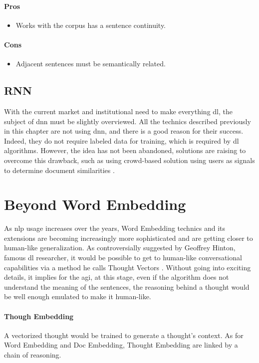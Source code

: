 \paragraph{Pros}
\begin{itemize}
    \setlength\itemsep{0em}
    \item Works with the corpus has a sentence continuity.
\end{itemize}
\paragraph{Cons}
\begin{itemize}
    \setlength\itemsep{0em}
    \item Adjacent sentences must be semantically related.
\end{itemize}

\subsection{RNN}
With the current market and institutional need to make everything \gls{dl}, the subject of \gls{dnn} must be slightly overviewed. All the technics described previously in this chapter are not using \gls{dnn}, and there is a good reason for their success. Indeed, they do not require labeled data for training, which is required by \gls{dl} algorithms. However, the idea has not been abandoned, solutions are raising to overcome this drawback, such as using crowd-based solution using users as signals to determine document similarities \cite{article:lstm-deep-sentence-embedding}.



\section{Beyond Word Embedding}
As \gls{nlp} usage increases over the years, Word Embedding technics and its extensions are becoming increasingly more sophisticated and are getting closer to human-like generalization. As controversially suggested by Geoffrey Hinton, famous \gls{dl} researcher, it would be possible to get to human-like conversational capabilities via a method he calls Thought Vectors \cite{article:thought2vec-geoffrey-hinton}. Without going into exciting details, it implies for the \gls{agi}, at this stage, even if the algorithm does not understand the meaning of the sentences, the reasoning behind a thought would be well enough emulated to make it human-like.

\paragraph{Though Embedding}
A vectorized thought would be trained to generate a thought’s context. As for Word Embedding and Doc Embedding,  Thought Embedding are linked by a chain of reasoning.


